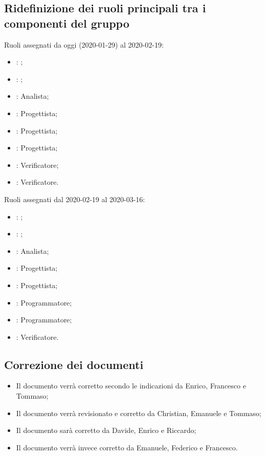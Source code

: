 \subsection{Ridefinizione dei ruoli principali tra i componenti del gruppo}
Ruoli assegnati da oggi (2020-01-29) al 2020-02-19:
\begin{itemize}
	\item \MC{}: \Responsabile{};
	\item \CE{}: \Amministratore{};
	\item \AT{}: Analista;
	\item \LD{}: Progettista; 
	\item \DF{}: Progettista;
	\item \SE{}: Progettista;
	\item \PF{}: Verificatore;
	\item \BR{}: Verificatore.
\end{itemize}

Ruoli assegnati dal 2020-02-19 al 2020-03-16:
\begin{itemize}
	\item \LD{}: \Responsabile{}; 
	\item \SE{}: \Amministratore{};
	\item \DF{}: Analista;
	\item \CE{}: Progettista;
	\item \MC{}: Progettista;
	\item \BR{}: Programmatore;
	\item \PF{}: Programmatore;
	\item \AT{}: Verificatore.
\end{itemize}

\subsection{Correzione dei documenti}
\begin{itemize}
	\item Il documento \AdR{} verrà corretto secondo le indicazioni da Enrico, Francesco e Tommaso;
	\item Il documento \PdP{} verrà revisionato e corretto da Christian, Emanuele e Tommaso;
	\item Il documento \NdP{} sarà corretto da Davide, Enrico e Riccardo;
	\item Il documento \PdQ{} verrà invece corretto da Emanuele, Federico e Francesco.
\end{itemize}

\clearpage